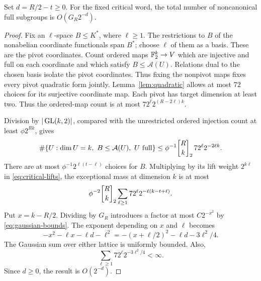 \begin{proposition}\label{prop:extra-lifts}
Set $d=R/2-t\geq0$. For the fixed critical word, the total number of
noncanonical full subgroups is $O(G_R2^{-d})$.
\end{proposition}
\begin{proof}
Fix an $\ell$-space $B\leq K^*$, where $\ell\geq1$. The restrictions
to $B$ of the nonabelian coordinate functionals span $B^*$; choose
$\ell$ of them as a basis. These are the pivot coordinates. Count ordered maps $\mathbb F_2^k\to V$ which are injective
and full on each coordinate and which satisfy $B\leq\mathcal A(U)$.
Relations dual to the chosen basis isolate the pivot coordinates.
Thus fixing the nonpivot maps fixes every pivot quadratic form jointly. Lemma~\ref{lem:quadratic} allows at most
$72$ choices for its surjective coordinate map. Each pivot has target
dimension at least two. Thus the ordered-map count is at most
$72^\ell2^{(R-2\ell)k}$.

Division by $|\operatorname{GL}(k,2)|$, compared with the unrestricted ordered
injection count at least $\phi2^{Rk}$, gives
\[
 \#\{U:\dim U=k,\ B\leq\mathcal A(U),\ U\text{ full}\}
 \leq\phi^{-1}\gauss Rk2\,72^\ell2^{-2\ell k}.
\]
There are at most $\phi^{-1}2^{\ell(t-\ell)}$ choices for $B$.
Multiplying by its lift weight $2^{k\ell}$ in
\eqref{eq:critical-lifts}, the exceptional mass at dimension $k$ is at
most
\begin{equation}\label{eq:exception-k}
 \phi^{-2}\gauss Rk2\sum_{\ell\geq1}
 72^\ell2^{-\ell(k-t+\ell)}.
\end{equation}
Put $x=k-R/2$. Dividing by $G_R$ introduces a factor at most
$C2^{-x^2}$ by \eqref{eq:gaussian-bounds}. The exponent depending on
$x$ and $\ell$ becomes
\[
 -x^2-\ell x-\ell d-\ell^2
 =-(x+\ell/2)^2-\ell d-3\ell^2/4.
\]
The Gaussian sum over either lattice is uniformly bounded. Also,
\[
 \sum_{\ell\geq1}72^\ell2^{-3\ell^2/4}<\infty.
\]
Since $d\geq0$, the result is $O(2^{-d})$.
\end{proof}

